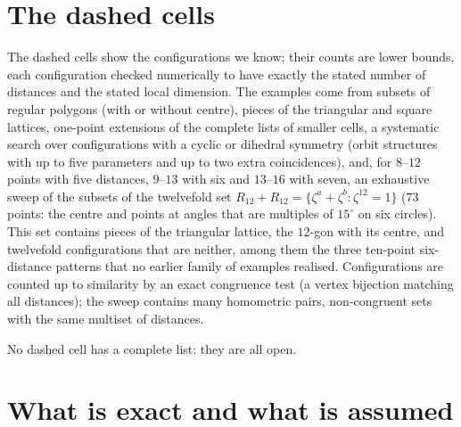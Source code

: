 \documentclass[11pt]{amsart}
\theoremstyle{remark}
\begin{document}
\section{The dashed cells}\label{sec:dashed}

The dashed cells show the configurations we know; their counts are lower bounds, each configuration checked
numerically to have exactly the stated number of distances and the stated local dimension. The examples come
from subsets of regular polygons (with or without centre), pieces of the triangular and square lattices,
one-point extensions of the complete lists of smaller cells, a systematic search over configurations with a
cyclic or dihedral symmetry (orbit structures with up to five parameters and up to two extra
coincidences), and, for $8$--$12$ points with five distances, $9$--$13$ with six and $13$--$16$ with seven,
an exhaustive sweep of the subsets of the twelvefold set
$R_{12}+R_{12}=\{\zeta^a+\zeta^b:\zeta^{12}=1\}$ ($73$ points: the centre and points at angles that are
multiples of $15^\circ$ on six circles). This set contains pieces of the triangular lattice, the $12$-gon
with its centre, and twelvefold configurations that are neither, among them the three ten-point six-distance
patterns that no earlier family of examples realised. Configurations are counted up to similarity by an
exact congruence test (a vertex bijection matching all distances); the sweep contains many homometric pairs,
non-congruent sets with the same multiset of distances.

No dashed cell has a complete list: they are all open.

\section{What is exact and what is assumed}\label{sec:assume}
\end{document}
